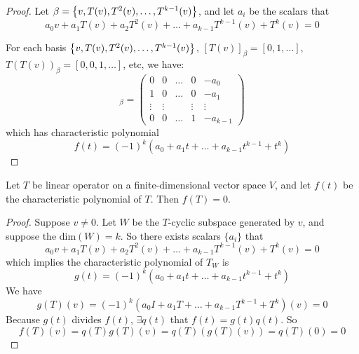 \begin{proof}
    Let $\beta = \set{v, T(v), T^2(v), \dots, T^{k-1}(v)}$, and let $a_i$ be the scalars that 
    \begin{equation*}
            a_0 v + a_1 T(v) + a_2 T^2(v) + \dots + a_{k-1} T^{k-1}(v) + T^k(v) = 0
    \end{equation*}
    
    For each basis $\set{v, T(v), T^2(v), \dots, T^{k-1}(v)}$, $[T(v)]_\beta = [0,1,\dots]$, $T(T(v))_\beta = [0,0,1,\dots]$, etc, we have:
    \begin{equation*}
        [T_W]_\beta = \begin{pmatrix}
            0 & 0 & \dots & 0 & - a_0 \\
            1 & 0 & \dots & 0 & -a_1\\
            \vdots & \vdots  & & \vdots & \vdots \\
            0 & 0 & \dots & 1 & - a_{k-1}
        \end{pmatrix}
    \end{equation*}
    which has characteristic polynomial 
    \begin{equation*}
        f(t) = (-1)^k (a_0 + a_1 t + \dots + a_{k-1} t^{k-1} + t^k)
    \end{equation*}
\end{proof}

\begin{theorem}
    Let $T$ be linear operator on a finite-dimensional vector space $V$, and let $f(t)$ be the characteristic polynomial of $T$. Then $f(T) = 0$.
\end{theorem}

\begin{proof}
    Suppose $v \neq 0$. Let $W$ be the $T$-cyclic subspace generated by $v$, and suppose the $\text{dim}(W)=k$. So there exists scalars $\{a_i\}$ that 
    \begin{equation*}
        a_0 v + a_1 T(v) + a_2 T^2(v) + \dots + a_{k-1} T^{k-1}(v) + T^k(v) = 0
    \end{equation*}
    which implies the characteristic polynomial of $T_W$ is
    \begin{equation*}
        g(t) = (-1)^k (a_0 + a_1 t + \dots + a_{k-1} t^{k-1} + t^k)
    \end{equation*}
    We have
    \begin{equation*}
        g(T)(v) = (-1)^k (a_0 I + a_1 T + \dots + a_{k-1} T^{k-1} + T^k)(v) = 0
    \end{equation*}
    Because $g(t)$ divides $f(t)$, $\exists q(t)$ that $f(t) = g(t) q(t)$. So
    \begin{equation*}
        f(T)(v) = q(T)g(T)(v) = q(T) (g(T)(v)) = q(T)(0) = 0
    \end{equation*}
\end{proof}



